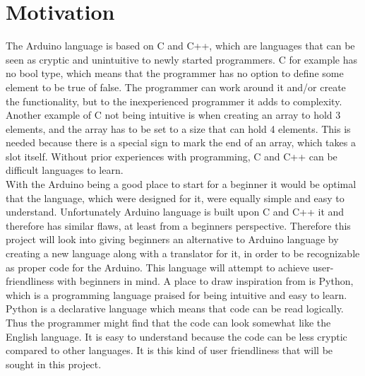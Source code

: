 \section{Motivation}\label{introduction:motivation}
The Arduino language is based on C and C++, which are languages that can be seen as cryptic and unintuitive to newly started programmers. C for example has no bool type, which means that the programmer has no option to define some element to be true of false. The programmer can work around it and/or create the functionality, but to the inexperienced programmer it adds to complexity. Another example of C not being intuitive is when creating an array to hold 3 elements, and the array has to be set to a size that can hold 4 elements. This is needed because there is a special sign to mark the end of an array, which takes a slot itself.  Without prior experiences with programming, C and C++ can be difficult languages to learn. \\

With the Arduino being a good place to start for a beginner it would be optimal that the language, which were designed for it, were equally simple and easy to understand. Unfortunately Arduino language is built upon C and C++ it and therefore has similar flaws, at least from a beginners perspective. Therefore this project will look into giving beginners an alternative to Arduino language by creating a new language along with a translator for it, in order to be recognizable as proper code for the Arduino. This language will attempt to achieve user-friendliness with beginners in mind. A place to draw inspiration from is Python, which is a programming language praised for being intuitive and easy to learn. \cite{python:about} Python is a declarative language which means that code can be read logically. Thus the programmer might find that the code can look somewhat like the English language. It is easy to understand because the code can be less cryptic compared to other languages. It is this kind of user friendliness that will be sought in this project.